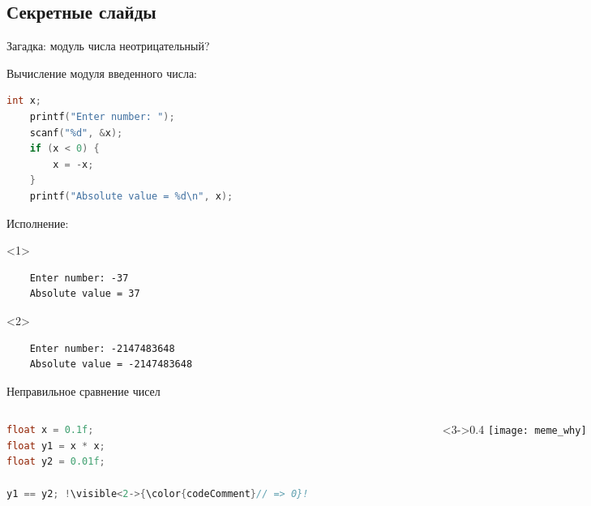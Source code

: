 

\begin{backup}


\section{Секретные слайды}


\begin{frame}[fragile]{Загадка: модуль числа неотрицательный?}

  \begin{block}{Вычисление модуля введенного числа:}
    \begin{lstlisting}[language=C]
    int x;
    printf("Enter number: ");
    scanf("%d", &x);
    if (x < 0) {
        x = -x;
    }
    printf("Absolute value = %d\n", x);
    \end{lstlisting}
  \end{block}

  \begin{block}{Исполнение:}
    \begin{onlyenv}<1>\begin{lstlisting}
    Enter number: -37
    Absolute value = 37
    \end{lstlisting}\end{onlyenv}
    \begin{onlyenv}<2>\begin{lstlisting}
    Enter number: -2147483648
    Absolute value = -2147483648
    \end{lstlisting}\end{onlyenv}
  \end{block}

\end{frame}


\begin{frame}[fragile]{Неправильное сравнение чисел}

  \begin{columns}[onlytextwidth,c]
    \begin{column}{0.6\textwidth}
      \begin{lstlisting}[language=C,escapechar=\!]
float x = 0.1f;
float y1 = x * x;
float y2 = 0.01f;

y1 == y2; !\visible<2->{\color{codeComment}// => 0}!
      \end{lstlisting}
    \end{column}

    \begin{column}<3->{0.4\textwidth}
      \texttt{[image: meme\_why]}
    \end{column}


\end{columns}
\end{frame}
\end{backup}
